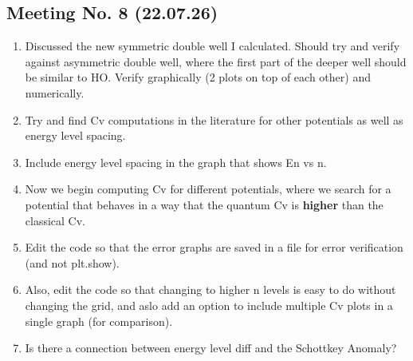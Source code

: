 \documentclass{article}
\numberwithin{equation}{subsection}
\begin{document}
\subsection*{Meeting No. 8 (22.07.26)}
\begin{enumerate}[label=\textbf{\Alph*.}]
    \item Discussed the new symmetric double well I calculated. Should try and verify against asymmetric double well, where the first part of the deeper well should be similar to HO. Verify graphically (2 plots on top of each other) and numerically.
    \item Try and find Cv computations in the literature for other potentials as well as energy level spacing.
    \item Include energy level spacing in the graph that shows En vs n. 
    \item Now we begin computing Cv for different potentials, where we search for a potential that behaves in a way that the quantum Cv is \textbf{higher} than the classical Cv.
    \item Edit the code so that the error graphs are saved in a file for error verification (and not plt.show).
    \item Also, edit the code so that changing to higher n levels is easy to do without changing the grid, and aslo add an option to include multiple Cv plots in a single graph (for comparison).
    \item Is there a connection between energy level diff and the Schottkey Anomaly?
\end{enumerate}
\end{document}
